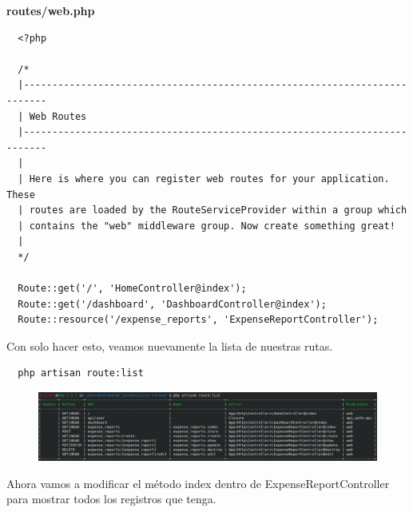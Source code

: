 \documentclass{article}
\begin{document}
\textbf{routes/web.php}
\begin{verbatim}
  <?php

  /*
  |--------------------------------------------------------------------------
  | Web Routes
  |--------------------------------------------------------------------------
  |
  | Here is where you can register web routes for your application. These
  | routes are loaded by the RouteServiceProvider within a group which
  | contains the "web" middleware group. Now create something great!
  |
  */

  Route::get('/', 'HomeController@index');
  Route::get('/dashboard', 'DashboardController@index');
  Route::resource('/expense_reports', 'ExpenseReportController');
\end{verbatim}

Con solo hacer esto, veamos nuevamente la lista de nuestras rutas.

\begin{verbatim}
  php artisan route:list
\end{verbatim}

\begin{figure}[h!]
  \centering
  \includegraphics[scale=0.5]{./Pictures/051_rout_list_after.png}
\end{figure}

Ahora vamos a modificar el método index dentro de ExpenseReportController para
mostrar todos los registros que tenga.
\end{document}
